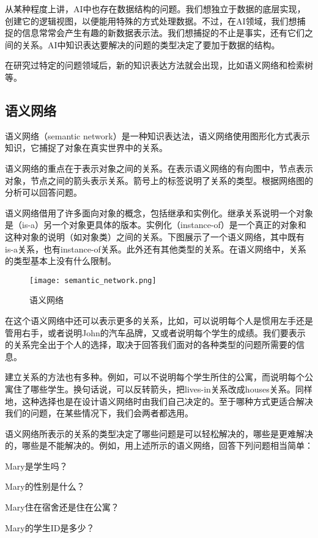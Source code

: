 从某种程度上讲，AI中也存在数据结构的问题。我们想独立于数据的底层实现，创建它的逻辑视图，以便能用特殊的方式处理数据。不过，在AI领域，我们想捕捉的信息常常会产生有趣的新数据表示法。我们想捕捉的不止是事实，还有它们之间的关系。AI中知识表达要解决的问题的类型决定了要加于数据的结构。

在研究过特定的问题领域后，新的知识表达方法就会出现，比如语义网络和检索树等。




\subsection{语义网络}


语义网络（semantic network）是一种知识表达法，语义网络使用图形化方式表示知识，它捕捉了对象在真实世界中的关系。

语义网络的重点在于表示对象之间的关系。在表示语义网络的有向图中，节点表示对象，节点之间的箭头表示关系。箭号上的标签说明了关系的类型。根据网络图的分析可以回答问题。

语义网络借用了许多面向对象的概念，包括继承和实例化。继承关系说明一个对象是（is-a）另一个对象更具体的版本。实例化（instance-of）是一个真正的对象和这种对象的说明（如对象类）之间的关系。下图展示了一个语义网络，其中既有is-a关系，也有instance-of关系。此外还有其他类型的关系。在语义网络中，关系的类型基本上没有什么限制。


\begin{figure}[!ht]
\centering
\texttt{[image: semantic\_network.png]}
\caption{语义网络}
\label{semantic_network}
\end{figure}

在这个语义网络中还可以表示更多的关系，比如，可以说明每个人是惯用左手还是管用右手，或者说明John的汽车品牌，又或者说明每个学生的成绩。我们要表示的关系完全出于个人的选择，取决于回答我们面对的各种类型的问题所需要的信息。

建立关系的方法也有多种。例如，可以不说明每个学生所住的公寓，而说明每个公寓住了哪些学生。换句话说，可以反转箭头，把lives-in关系改成houses关系。同样地，这种选择也是在设计语义网络时由我们自己决定的。至于哪种方式更适合解决我们的问题，在某些情况下，我们会两者都选用。

语义网络所表示的关系的类型决定了哪些问题是可以轻松解决的，哪些是更难解决的，哪些是不能解决的。例如，用上述所示的语义网络，回答下列问题相当简单：

\begin{compactitem}
\item Mary是学生吗？
\item Mary的性别是什么？
\item Mary住在宿舍还是住在公寓？
\item Mary的学生ID是多少？
\end{compactitem}

